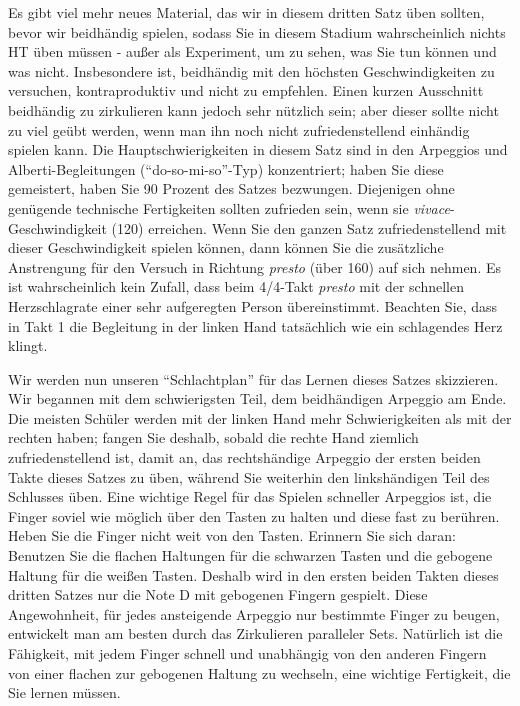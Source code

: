Es gibt viel mehr neues Material, das wir in diesem dritten Satz üben sollten, bevor wir beidhändig spielen, sodass Sie in diesem Stadium wahrscheinlich nichts HT üben müssen - außer als Experiment, um zu sehen, was Sie tun können und was nicht.
Insbesondere ist, beidhändig mit den höchsten Geschwindigkeiten zu versuchen, kontraproduktiv und nicht zu empfehlen.
Einen kurzen Ausschnitt beidhändig zu zirkulieren kann jedoch sehr nützlich sein; aber dieser sollte nicht zu viel geübt werden, wenn man ihn noch nicht zufriedenstellend einhändig spielen kann.
Die Hauptschwierigkeiten in diesem Satz sind in den Arpeggios und Alberti-Begleitungen (\enquote{do-so-mi-so}-Typ)  konzentriert; haben Sie diese gemeistert, haben Sie 90 Prozent des Satzes bezwungen.
Diejenigen ohne genügende technische Fertigkeiten sollten zufrieden sein, wenn sie \textit{vivace}-Geschwindigkeit (120) erreichen.
Wenn Sie den ganzen Satz zufriedenstellend mit dieser Geschwindigkeit spielen können, dann können Sie die zusätzliche Anstrengung für den Versuch in Richtung \textit{presto} (über 160) auf sich nehmen.
Es ist wahrscheinlich kein Zufall, dass beim 4/4-Takt \textit{presto} mit der schnellen Herzschlagrate einer sehr aufgeregten Person übereinstimmt.
Beachten Sie, dass in Takt 1 die Begleitung in der linken Hand tatsächlich wie ein schlagendes Herz klingt.

Wir werden nun unseren \enquote{Schlachtplan} für das Lernen dieses Satzes skizzieren.
Wir begannen mit dem schwierigsten Teil, dem beidhändigen Arpeggio am Ende.
Die meisten Schüler werden mit der linken Hand mehr Schwierigkeiten als mit der rechten haben; fangen Sie deshalb, sobald die rechte Hand ziemlich zufriedenstellend ist, damit an, das rechtshändige Arpeggio der ersten beiden Takte dieses Satzes zu üben, während Sie weiterhin den linkshändigen Teil des Schlusses üben.
Eine wichtige Regel für das Spielen schneller Arpeggios ist, die Finger soviel wie möglich über den Tasten zu halten und diese fast zu berühren.
Heben Sie die Finger nicht weit von den Tasten.
Erinnern Sie sich daran: Benutzen Sie die flachen Haltungen für die schwarzen Tasten und die gebogene Haltung für die weißen Tasten.
Deshalb wird in den ersten beiden Takten dieses dritten Satzes nur die Note D mit gebogenen Fingern gespielt.
Diese Angewohnheit, für jedes ansteigende Arpeggio nur bestimmte Finger zu beugen, entwickelt man am besten durch das Zirkulieren paralleler Sets.
Natürlich ist die Fähigkeit, mit jedem Finger schnell und unabhängig von den anderen Fingern von einer flachen zur gebogenen Haltung zu wechseln, eine wichtige Fertigkeit, die Sie lernen müssen.

